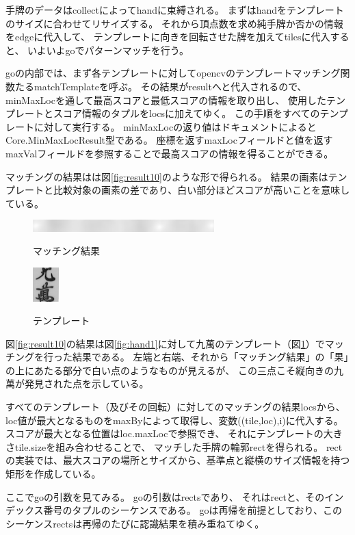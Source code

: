 \documentclass{jsarticle}
\begin{document}
\begin{multicols}{2}
手牌のデータはcollectによってhandに束縛される。
まずはhandをテンプレートのサイズに合わせてリサイズする。
それから頂点数を求め純手牌か否かの情報をedgeに代入して、
テンプレートに向きを回転させた牌を加えてtilesに代入すると、
いよいよgoでパターンマッチを行う。
	
goの内部では、まず各テンプレートに対してopencvのテンプレートマッチング関数たるmatchTemplateを呼ぶ。
その結果がresultへと代入されるので、
minMaxLocを通して最高スコアと最低スコアの情報を取り出し、
使用したテンプレートとスコア情報のタプルをlocsに加えてゆく。
この手順をすべてのテンプレートに対して実行する。
minMaxLocの返り値はドキュメントによると\cite{minMaxLoc}
Core.MinMaxLocResult型である。
座標を返すmaxLocフィールドと値を返すmaxValフィールドを参照することで最高スコアの情報を得ることができる。

マッチングの結果はは図\ref{fig:result10}のような形で得られる。
結果の画素はテンプレートと比較対象の画素の差であり、白い部分ほどスコアが高いことを意味している。

\begin{figure}[H]
  \begin{center}
    \includegraphics[clip,width=7.0cm]{./img/matching_result1_0.png}
    \caption{マッチング結果}
    \label{fig:result10}
    \includegraphics[clip,width=1.0cm]{./img/9wan.png}
    \caption{テンプレート}
    \label{fig:9wan}
  \end{center}
\end{figure}

図\ref{fig:result10}の結果は図\ref{fig:hand1}に対して九萬のテンプレート（図\ref{fig:9wan}）でマッチングを行った結果である。
左端と右端、それから「マッチング結果」の「果」の上にあたる部分で白い点のようなものが見えるが、
この三点こそ縦向きの九萬が発見された点を示している。

すべてのテンプレート（及びその回転）に対してのマッチングの結果locsから、
loc値が最大となるものをmaxByによって取得し、変数((tile,loc),i)に代入する。
スコアが最大となる位置はloc.maxLocで参照でき、
それにテンプレートの大きさtile.sizeを組み合わせることで、
マッチした手牌の輪郭rectを得られる。
rectの実装では、最大スコアの場所とサイズから、基準点と縦横のサイズ情報を持つ矩形を作成している。

ここでgoの引数を見てみる。
goの引数はrectsであり、
それはrectと、そのインデックス番号のタプルのシーケンスである。
goは再帰を前提としており、このシーケンスrectsは再帰のたびに認識結果を積み重ねてゆく。


\end{multicols}
\end{document}
